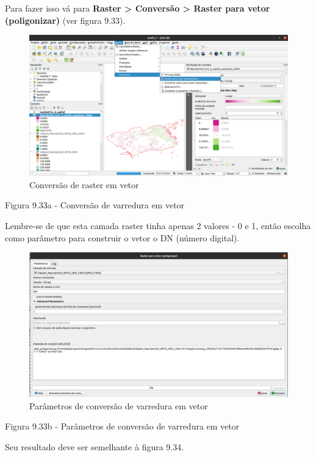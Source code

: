 \documentclass[
]{krantz}
\begin{document}
Para fazer isso vá para \textbf{Raster \textgreater{} Conversão \textgreater{} Raster para vetor (poligonizar)} (ver figura 9.33).

\begin{figure}
\centering
\includegraphics{media/modulo9/fig933_a.png}
\caption{Conversão de raster em vetor}
\end{figure}

Figura 9.33a - Conversão de varredura em vetor

Lembre-se de que esta camada raster tinha apenas 2 valores - 0 e 1, então escolha como parâmetro para construir o vetor o DN (número digital).

\begin{figure}
\centering
\includegraphics{media/modulo9/fig933_b.png}
\caption{Parâmetros de conversão de varredura em vetor}
\end{figure}

Figura 9.33b - Parâmetros de conversão de varredura em vetor

Seu resultado deve ser semelhante à figura 9.34.
\end{document}
